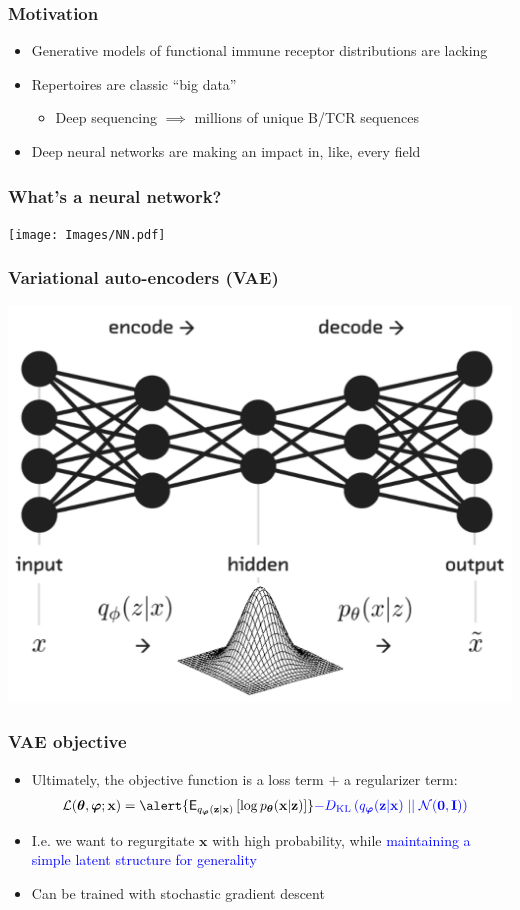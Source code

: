 \documentclass[mathserif,compress]{beamer}
\newcommand*\ba{\[ \begin{aligned}}
\newcommand*\ea{\end{aligned} \]}
\newcommand*\Esub[2]{\mathsf{E}_{#1}\left[#2\right]}
\renewcommand\;{\,}
\renewcommand\phi{\varphi}
\begin{document}
\begin{frame}\frametitle{Motivation}
\begin{itemize}
\item
Generative models of functional immune receptor distributions are lacking
\bigskip
\item
Repertoires are classic ``big data'' 
\bigskip
\begin{itemize}
\item
Deep sequencing $\implies$ millions of unique B/TCR sequences
\end{itemize}
\bigskip
\item
Deep neural networks are making an impact in, like, every field
\end{itemize}
\end{frame}

\begin{frame}\frametitle{What's a neural network?}
\begin{center}
\texttt{[image: Images/NN.pdf]}
\end{center}
\end{frame}

\begin{frame}\frametitle{Variational auto-encoders (VAE)}
\begin{center}
\includegraphics[width=0.8\linewidth]{Images/VAE_NN.png}
\end{center}
\end{frame}

\begin{frame}\frametitle{VAE objective}
\begin{itemize}
\item
Ultimately, the objective function is a loss term $+$ a regularizer term:
\smallskip
\ba
\mathcal L (\boldsymbol \theta, \boldsymbol \phi ; \mathbf x)
	& = \alert{ \Esub{q_{\boldsymbol \phi}(\mathbf z | \mathbf x) }
		{\log p_{\boldsymbol \theta}(\mathbf x | \mathbf z) } }
		 \textcolor{blue}{ - D_\text{KL} \left( 
			q_{\boldsymbol \phi}(\mathbf z | \mathbf x) 
			\mid\mid
			\mathcal N(\mathbf 0, \mathbf I) \right) }
\ea
\smallskip
\item
I.e. we want to \alert{regurgitate $\mathbf x$ with high probability}, while \textcolor{blue}{maintaining a simple latent structure for generality}
\bigskip
\item
Can be trained with stochastic gradient descent
\end{itemize}
\end{frame}
\end{document}
